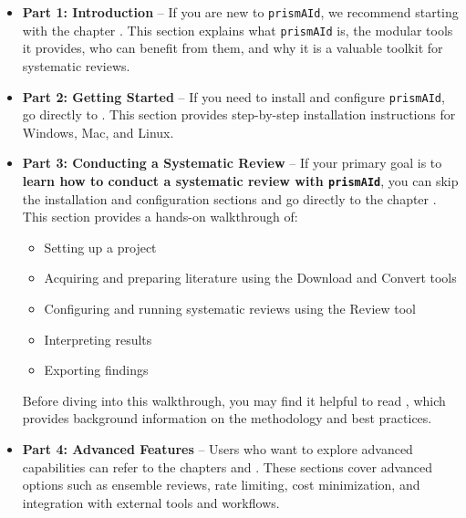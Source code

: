 \begin{itemize}
    \item \textbf{Part 1: Introduction} -- If you are new to \texttt{prismAId}, we recommend starting with the chapter . This section explains what \texttt{prismAId} is, the modular tools it provides, who can benefit from them, and why it is a valuable toolkit for systematic reviews.

    \item \textbf{Part 2: Getting Started} -- If you need to install and configure \texttt{prismAId}, go directly to . This section provides step-by-step installation instructions for Windows, Mac, and Linux.

    \item \textbf{Part 3: Conducting a Systematic Review} -- If your primary goal is to \textbf{learn how to conduct a systematic review with \texttt{prismAId}}, you can skip the installation and configuration sections and go directly to the chapter . This section provides a hands-on walkthrough of:
    \begin{itemize}
        \item Setting up a project
        \item Acquiring and preparing literature using the Download and Convert tools
        \item Configuring and running systematic reviews using the Review tool
        \item Interpreting results
        \item Exporting findings
    \end{itemize}
    Before diving into this walkthrough, you may find it helpful to read , which provides background information on the methodology and best practices.

    \item \textbf{Part 4: Advanced Features} -- Users who want to explore advanced capabilities can refer to the chapters  and . These sections cover advanced options such as ensemble reviews, rate limiting, cost minimization, and integration with external tools and workflows.


\end{itemize}
